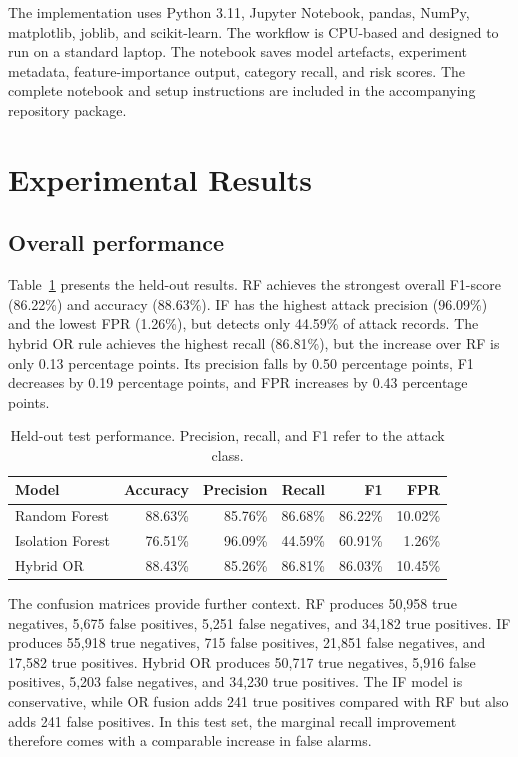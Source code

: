 \documentclass[runningheads]{llncs}
\begin{document}
The implementation uses Python 3.11, Jupyter Notebook, pandas, NumPy, matplotlib, joblib, and scikit-learn. The workflow is CPU-based and designed to run on a standard laptop. The notebook saves model artefacts, experiment metadata, feature-importance output, category recall, and risk scores. The complete notebook and setup instructions are included in the accompanying repository package.

\section{Experimental Results}
\subsection{Overall performance}
Table~\ref{tab:metrics} presents the held-out results. RF achieves the strongest overall F1-score (86.22\%) and accuracy (88.63\%). IF has the highest attack precision (96.09\%) and the lowest FPR (1.26\%), but detects only 44.59\% of attack records. The hybrid OR rule achieves the highest recall (86.81\%), but the increase over RF is only 0.13 percentage points. Its precision falls by 0.50 percentage points, F1 decreases by 0.19 percentage points, and FPR increases by 0.43 percentage points.

\begin{table}[t]
\caption{Held-out test performance. Precision, recall, and F1 refer to the attack class.}
\label{tab:metrics}
\centering
\begin{tabular}{lrrrrr}
\toprule
Model & Accuracy & Precision & Recall & F1 & FPR\\
\midrule
Random Forest & 88.63\% & 85.76\% & 86.68\% & 86.22\% & 10.02\%\\
Isolation Forest & 76.51\% & 96.09\% & 44.59\% & 60.91\% & 1.26\%\\
Hybrid OR & 88.43\% & 85.26\% & 86.81\% & 86.03\% & 10.45\%\\
\bottomrule
\end{tabular}
\end{table}

The confusion matrices provide further context. RF produces 50,958 true negatives, 5,675 false positives, 5,251 false negatives, and 34,182 true positives. IF produces 55,918 true negatives, 715 false positives, 21,851 false negatives, and 17,582 true positives. Hybrid OR produces 50,717 true negatives, 5,916 false positives, 5,203 false negatives, and 34,230 true positives. The IF model is conservative, while OR fusion adds 241 true positives compared with RF but also adds 241 false positives. In this test set, the marginal recall improvement therefore comes with a comparable increase in false alarms.
\end{document}
